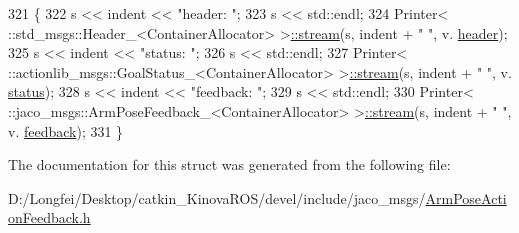 \begin{DoxyCode}
321   \{
322     s << indent << \textcolor{stringliteral}{"header: "};
323     s << std::endl;
324     Printer< ::std\_msgs::Header\_<ContainerAllocator> >\hyperlink{structros_1_1message__operations_1_1Printer_3_01_1_1jaco__msgs_1_1ArmPoseActionFeedback___3_01ContainerAllocator_01_4_01_4_a6195b98ad1b783b9c62f8a832901d203}{::stream}(s, indent + \textcolor{stringliteral}{"  "}, v.
      \hyperlink{structjaco__msgs_1_1ArmPoseActionFeedback___af09503192cc1120085e2f8ef58ab0dbb}{header});
325     s << indent << \textcolor{stringliteral}{"status: "};
326     s << std::endl;
327     Printer< ::actionlib\_msgs::GoalStatus\_<ContainerAllocator> >\hyperlink{structros_1_1message__operations_1_1Printer_3_01_1_1jaco__msgs_1_1ArmPoseActionFeedback___3_01ContainerAllocator_01_4_01_4_a6195b98ad1b783b9c62f8a832901d203}{::stream}(s, indent + \textcolor{stringliteral}{"  "}, v.
      \hyperlink{structjaco__msgs_1_1ArmPoseActionFeedback___a386a2bed5a7ad4dcd6b6135799f9882d}{status});
328     s << indent << \textcolor{stringliteral}{"feedback: "};
329     s << std::endl;
330     Printer< ::jaco\_msgs::ArmPoseFeedback\_<ContainerAllocator> >\hyperlink{structros_1_1message__operations_1_1Printer_3_01_1_1jaco__msgs_1_1ArmPoseActionFeedback___3_01ContainerAllocator_01_4_01_4_a6195b98ad1b783b9c62f8a832901d203}{::stream}(s, indent + \textcolor{stringliteral}{"  "}, v.
      \hyperlink{structjaco__msgs_1_1ArmPoseActionFeedback___a27069f4ef80d8c3546354691d3511059}{feedback});
331   \}
\end{DoxyCode}


The documentation for this struct was generated from the following file\+:\begin{DoxyCompactItemize}
\item 
D\+:/\+Longfei/\+Desktop/catkin\+\_\+\+Kinova\+R\+O\+S/devel/include/jaco\+\_\+msgs/\hyperlink{ArmPoseActionFeedback_8h}{Arm\+Pose\+Action\+Feedback.\+h}\end{DoxyCompactItemize}
